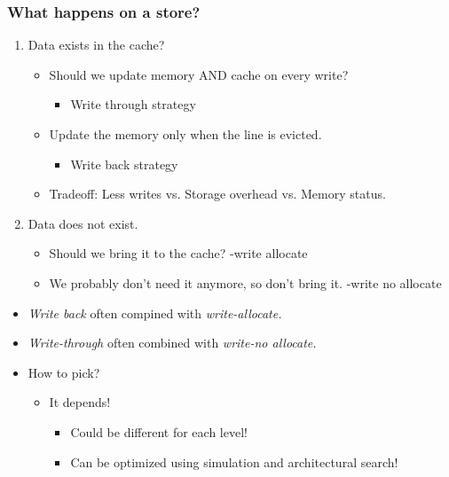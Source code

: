 \documentclass[10pt]{article}
\begin{document}
\subsubsection*{What happens on a store?}
\begin{enumerate}
    \item Data exists in the cache?
    \begin{itemize}
        \item Should we update memory AND cache on every write?
        \begin{itemize}
            \item Write through strategy
        \end{itemize}
        \item Update the memory only when the line is evicted.
        \begin{itemize}
            \item Write back strategy
        \end{itemize}
        \item Tradeoff: Less writes vs. Storage overhead vs. Memory status.
    \end{itemize}
    \item Data does not exist.
    \begin{itemize}
        \item Should we bring it to the cache?  -write allocate
        \item We probably don't need it anymore, so don't bring it.  -write no allocate
    \end{itemize}
\end{enumerate}
\begin{itemize}
    \item \textit{Write back} often compined with \textit{write-allocate.}
    \item \textit{Write-through} often combined with \textit{write-no allocate.}
    \item How to pick?
    \begin{itemize}
        \item It depends!
        \begin{itemize}
            \item Could be different for each level!
            \item Can be optimized using simulation and architectural search!
        \end{itemize}
    \end{itemize}
\end{itemize}
\end{document}
